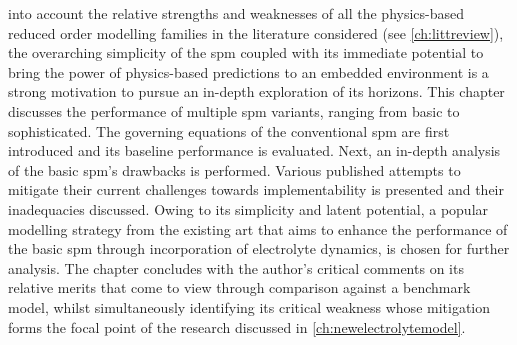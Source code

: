 

 into account the relative strengths and weaknesses of all
the physics-based reduced order modelling  families in the literature considered
(see \cref{ch:littreview}), the overarching  simplicity of the \gls{spm} coupled
with its immediate potential to bring  the power of physics-based predictions to
an embedded environment is a strong motivation to pursue an in-depth exploration
of its  horizons. This chapter  discusses the performance of  multiple \gls{spm}
variants, ranging  from basic to  sophisticated. The governing equations  of the
conventional  \gls{spm} are  first introduced  and its  baseline performance  is
evaluated.  Next, an  in-depth analysis  of the  basic \gls{spm}'s  drawbacks is
performed.  Various  published attempts  to  mitigate  their current  challenges
towards implementability is presented and their inadequacies discussed. Owing to
its  simplicity and  latent potential,  a  popular modelling  strategy from  the
existing art that aims to enhance the performance of the basic \gls{spm} through
incorporation  of electrolyte  dynamics,  is chosen  for  further analysis.  The
chapter concludes  with the  author's critical comments  on its  relative merits
that  come  to  view  through  comparison  against  a  benchmark  model,  whilst
simultaneously  identifying its  critical  weakness whose  mitigation forms  the
focal point of the research discussed in \cref{ch:newelectrolytemodel}.

